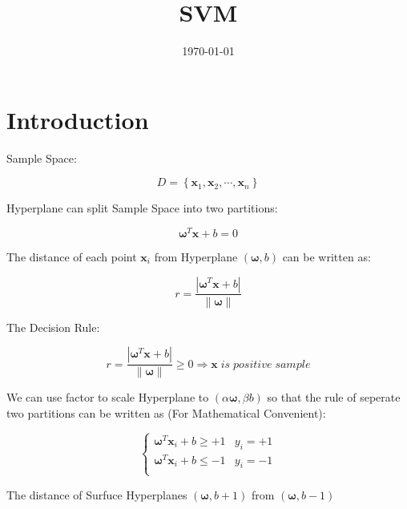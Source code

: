 \documentclass[a4paper,12pt]{article}
\title{SVM}
\date{\today}
\begin{document}
    \maketitle
    \tableofcontents
    \clearpage

    \section{Introduction}

        Sample Space:

        \begin{equation}
            D=\left\lbrace \bm{x}_1,\bm{x}_2,\cdots,\bm{x}_n\right\rbrace
        \end{equation}

        Hyperplane can split Sample Space into two partitions:

        \begin{equation}
            \bm{\omega}^T\bm{x}+b=0
        \end{equation}

        The distance of each point $\bm{x}_i$ from Hyperplane $(\bm{\omega},b)$ can be written as:

        \begin{equation}
            r=\frac{|\bm{\omega}^T\bm{x}+b|}{\|\bm{\omega}\|}
        \end{equation}

        The Decision Rule:

        \begin{equation}
            r=\frac{|\bm{\omega}^T\bm{x}+b|}{\|\bm{\omega}\|}\geq 0\Rightarrow \bm{x}\;is\;positive\;sample
        \end{equation}

        We can use factor to scale Hyperplane to $(\alpha\bm{\omega},\beta b)$ so that the rule of seperate two partitions can be written as (For Mathematical Convenient):

        \begin{equation}
            \label{rule}
            \begin{cases}
                \bm{\omega}^T\bm{x}_i+b\geq +1 & y_i=+1\\
                \bm{\omega}^T\bm{x}_i+b\leq -1 & y_i=-1\\
            \end{cases}
        \end{equation}

        The distance of Surfuce Hyperplanes $(\bm{\omega},b+1)$ from $(\bm{\omega},b-1)$
\end{document}
